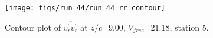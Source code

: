 \begin{figure}[H]
\centering
\texttt{[image: figs/run\_44/run\_44\_rr\_contour]}
\caption{Contour plot of $\overline{v_{r}^{\prime} v_{r}^{\prime}}$ at $z/c$=9.00, $V_{free}$=21.18, station 5.}
\label{fig:run_44_rr_contour}
\end{figure}


